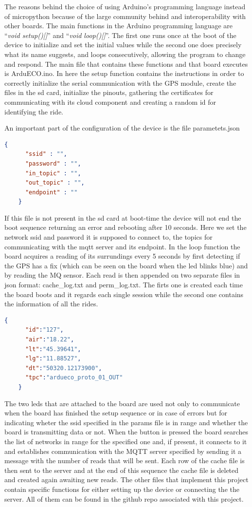 \documentclass[conference]{IEEEtran}
\begin{document}
		The reasons behind the choice of using Arduino's programming language instead of micropython \cite{micropyhton} because of the large community behind and interoperability with other boards.
		The main functions in the Arduino programming language are ``\textit{void setup()[]}'' and ``\textit{void loop()[]}''.
		The first one runs once at the boot of the device to initialize and set the initial values while the second one does precisely what its name suggests, and loops consecutively, allowing the program to change and respond.
		The main file that contains these functions and that board executes is ArduECO.ino.
		In here the setup function contains the instructions in order to correctly initialize the serial communication with the GPS module, create the files in the sd card, initialize the pinouts, gathering the certificates for communicating with its cloud component and creating a random id for identifying the ride.
		
		An important part of the configuration of the device is the file parametets.json
		\begin{lstlisting}[language=json,firstnumber=1]
    {
	  "ssid" : "",
	  "password" : "",
	  "in_topic" : "",
	  "out_topic" : "",
	  "endpoint" : ""
    }
		\end{lstlisting}
		If this file is not present in the sd card at boot-time the device will not end the boot sequence returning an error and rebooting after 10 seconds.
		Here we set the network ssid and password it is supposed to connect to, the topics for communicating with the mqtt server and its endpoint.
		In the loop function the board acquires a reading of its surrundings every 5 seconds by first detecting if the GPS has a fix (which can be seen on the board when the led blinks blue) and by reading the MQ sensor.
		Each read is then appended on two separate files in json format: cache\_log.txt and perm\_log.txt. The firts one is created each time the board boots and it regards each single session while the second one contains the information of all the rides.
		
		\begin{lstlisting}[language=json,firstnumber=1]		
    {
	  "id":"127",
	  "air":"18.22",
	  "lt":"45.39641",
	  "lg":"11.88527",
	  "dt":"50320.12173900",
	  "tpc":"ardueco_proto_01_OUT"
    }
		\end{lstlisting}	
		The two leds that are attached to the board are used not only to communicate when the board has finished the setup sequence or in case of errors but for indicating wheter the ssid specified in the params file is in range and whether the board is transmitting data or not.
		When the button is pressed the board searches the list of networks in range for the specified one and, if present, it connects to it and establishes communication with the MQTT server specified by sending it a message with the number of reads that will be sent.
		Each row of the cache file is then sent to the server and at the end of this sequence the cache file is deleted and created again awaiting new reads.
		The other files that implement this project contain specific functions for either setting up the device or connecting the the server.
		All of them can be found in the github repo associated with this project.
		
\end{document}
